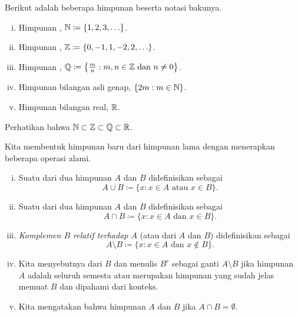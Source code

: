 \begin{example}
Berikut adalah beberapa himpunan beserta notasi bakunya.
\begin{enumerate}[(i)]
\item Himpunan \emph{},
${\mathbb{N}} \coloneqq \{ 1, 2, 3, \ldots
\}$.
\item Himpunan \emph{},
${\mathbb{Z}} \coloneqq \{ 0, -1, 1, -2, 2, \ldots
\}$.
\item Himpunan \emph{},
${\mathbb{Q}} \coloneqq \bigl\{ \frac{m}{n} :  m, n \in {\mathbb{Z}} \text{ dan } n \neq 0 \bigr\}$.
\item Himpunan bilangan asli genap, $\{  2m : m \in {\mathbb{N}} \}$.
\item Himpunan bilangan real,
${\mathbb{R}}$.
\end{enumerate}

Perhatikan bahwa ${\mathbb{N}} \subset {\mathbb{Z}} \subset {\mathbb{Q}} \subset {\mathbb{R}}$.
\end{example}

Kita membentuk himpunan baru dari himpunan lama dengan menerapkan beberapa
operasi alami.

\begin{defn}
\pagebreak[2]
\leavevmode
\begin{enumerate}[(i)]
\item
Suatu \emph{} dari dua himpunan $A$ dan $B$ didefinisikan
sebagai
\begin{equation*}
A \cup B \coloneqq \{ x : x \in A \text{ atau } x \in B \} .
\end{equation*}
\item
Suatu \emph{} dari dua himpunan $A$ dan $B$ didefinisikan
sebagai
\begin{equation*}
A \cap B \coloneqq \{ x : x \in A \text{ dan } x \in B \} .
\end{equation*}
\item
\emph{Komplemen $B$ relatif terhadap $A$}
(atau \emph{} dari $A$ dan $B$) didefinisikan sebagai
\begin{equation*}
A \setminus B \coloneqq \{ x : x \in A \text{ dan } x \notin B \} .
\end{equation*}
\item
Kita menyebutnya
\emph{} dari $B$ dan menulis $B^c$
 sebagai ganti $A \setminus B$ jika
himpunan $A$ adalah seluruh semesta atau merupakan himpunan yang sudah jelas
memuat $B$ dan dipahami dari konteks.
\item
Kita mengatakan bahwa himpunan $A$ dan $B$ \emph{} jika
$A \cap B = \emptyset$.
\end{enumerate}
\end{defn}

